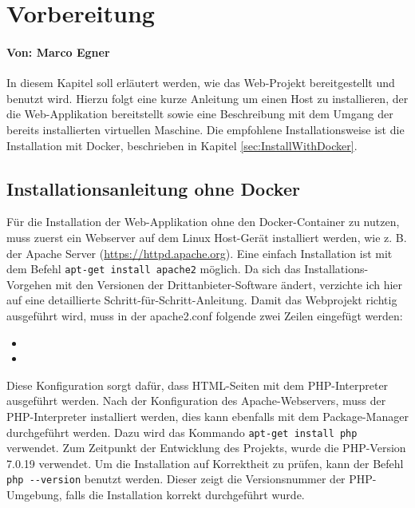 \chapter{Vorbereitung}
\subsubsection*{Von: Marco Egner}
In diesem Kapitel soll erläutert werden, wie das Web-Projekt bereitgestellt und benutzt wird. Hierzu folgt eine kurze Anleitung um einen Host zu installieren, der die Web-Applikation bereitstellt sowie eine Beschreibung mit dem Umgang der bereits installierten virtuellen Maschine. Die empfohlene Installationsweise ist die Installation mit Docker, beschrieben in Kapitel \ref{sec:InstallWithDocker}. 

\section{Installationsanleitung ohne Docker}
\label{sec:Install}

Für die Installation der Web-Applikation ohne den Docker-Container zu nutzen, muss zuerst ein Webserver auf dem Linux Host-Gerät installiert werden, wie z. B. der Apache Server (\url{https://httpd.apache.org}). Eine einfach Installation ist mit dem Befehl \colorbox{altgray}{\lstinline|apt-get install apache2|} möglich. Da sich das Installations-Vorgehen mit den Versionen der Drittanbieter-Software ändert, verzichte ich hier auf eine detaillierte Schritt-für-Schritt-Anleitung. Damit das Webprojekt richtig ausgeführt wird, muss in der apache2.conf folgende zwei Zeilen eingefügt werden:\medskip

\begin{itemize}
	\item {}
	\item {}\medskip
\end{itemize}
	
Diese Konfiguration sorgt dafür, dass HTML-Seiten mit dem PHP-Interpreter ausgeführt werden. Nach der Konfiguration des Apache-Webservers, muss der PHP-Interpreter installiert werden, dies kann ebenfalls mit dem Package-Manager durchgeführt werden. Dazu wird das Kommando \colorbox{altgray}{\lstinline|apt-get install php|} verwendet. Zum Zeitpunkt der Entwicklung des Projekts, wurde die PHP-Version 7.0.19 verwendet. Um die Installation auf Korrektheit zu prüfen, kann der Befehl \colorbox{altgray}{\lstinline|php --version|} benutzt werden. Dieser zeigt die Versionsnummer der PHP-Umgebung, falls die Installation korrekt durchgeführt wurde.\medskip

